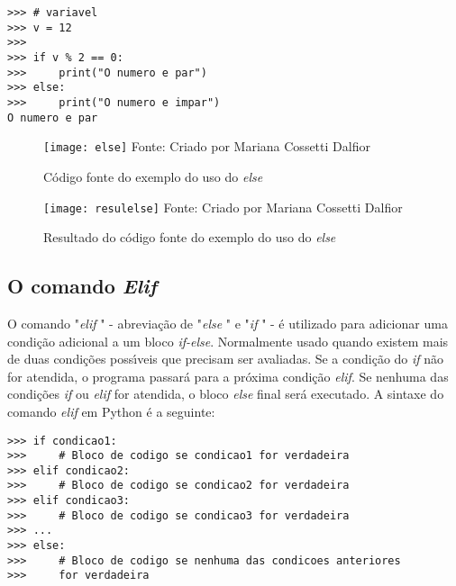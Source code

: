 \begin{lstlisting}
>>> # variavel
>>> v = 12
>>>
>>> if v % 2 == 0:
>>> 	print("O numero e par")
>>> else:
>>> 	print("O numero e impar")
O numero e par
\end{lstlisting}	

\begin{figure}[H]
\begin{center}
	\caption{C\'{o}digo fonte do exemplo do uso do \textsl{else}} \label{fonteelse}
	\texttt{[image: else]} 
	\newline
	Fonte: Criado por Mariana Cossetti Dalfior
\end{center}
\end{figure}

\begin{figure}[H]
\begin{center}
	\caption{Resultado do c\'{o}digo fonte do exemplo do uso do \textsl{else}} \label{resulelse}
	\texttt{[image: resulelse]} 
	\newline
	Fonte: Criado por Mariana Cossetti Dalfior
\end{center}
\end{figure}

			\subsection{O comando \textsl{Elif}}
O comando "\textsl{elif} " - abrevia\c{c}\~{a}o de "\textsl{else} "  e "\textsl{if} "  - \'{e} utilizado para adicionar uma condi\c{c}\~{a}o adicional a um bloco \textsl{if-else}. Normalmente usado quando existem mais de duas condi\c{c}\~{o}es poss\'{\i}veis que precisam ser avaliadas. Se a condi\c{c}\~{a}o do \textsl{if} n\~{a}o for atendida, o programa passar\'{a} para a pr\'{o}xima condi\c{c}\~{a}o \textsl{elif}. Se nenhuma das condi\c{c}\~{o}es \textsl{if} ou \textsl{elif} for atendida, o bloco \textsl{else} final ser\'{a} executado. A sintaxe do comando \textsl{elif} em Python \'{e} a seguinte: \newline

\begin{lstlisting}
>>> if condicao1:
>>> 	# Bloco de codigo se condicao1 for verdadeira
>>> elif condicao2:
>>> 	# Bloco de codigo se condicao2 for verdadeira
>>> elif condicao3:
>>> 	# Bloco de codigo se condicao3 for verdadeira
>>> ...
>>> else:
>>> 	# Bloco de codigo se nenhuma das condicoes anteriores 
>>> 	for verdadeira
\end{lstlisting}	

